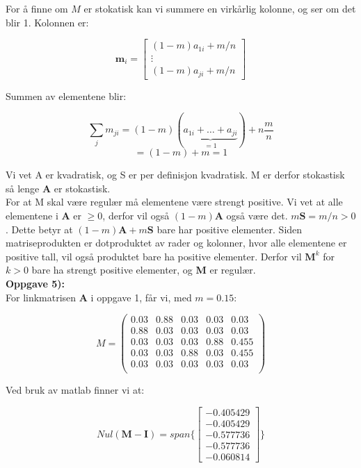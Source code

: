 \documentclass[a4paper,norsk,11pt,twoside]{article}
\begin{document}
For å finne om $M$ er stokatisk kan vi summere en virkårlig kolonne, og ser om det blir 1. Kolonnen er:

$$
\textbf{m}_i =
\begin{bmatrix}
(1-m)a_{1i} + m/n\\ \vdots \\ (1-m)a_{ji} + m/n
\end{bmatrix}
$$

Summen av elementene blir:

$$
\sum_j m_{ji} =  (1-m)(\underbrace{a_{1i} + \ldots + a_{ji}}_{=1}) + n\frac{m}{n}
$$
$$
= (1-m) + m = 1
$$

Vi vet A er kvadratisk, og S er per definisjon kvadratisk. M er derfor stokastisk så lenge \textbf{A} er stokastisk.\\

For at M skal være regulær må elementene være strengt positive. Vi vet at alle elementene i \textbf{A} er $\geq 0$, derfor vil også $(1-m)\textbf{A}$ også være det. $m\textbf{S} = m/n > 0$. Dette betyr at $(1-m)\textbf{A} + m\textbf{S}$ bare har positive elementer. Siden matriseprodukten er dotproduktet av rader og kolonner, hvor alle elementene er positive tall, vil også produktet bare ha positive elementer. Derfor vil $\textbf{M}^{k}$ for $k>0$ bare ha strengt positive elementer, og \textbf{M} er regulær.\\

\textbf{Oppgave 5):}\\

For linkmatrisen \textbf{A} i oppgave 1, får vi, med $m = 0.15$:

$$
M = 
\begin{pmatrix}
0.03 & 0.88 & 0.03 & 0.03 & 0.03\\
0.88 & 0.03 & 0.03 & 0.03 & 0.03\\
0.03 & 0.03 & 0.03 & 0.88 & 0.455\\
0.03 & 0.03 & 0.88 & 0.03 & 0.455\\
0.03 & 0.03 & 0.03 & 0.03 & 0.03\\
\end{pmatrix}
$$

Ved bruk av matlab finner vi at:

$$
Nul(\textbf{M} - \textbf{I}) = span\{ \begin{bmatrix}
-0.405429 \\ -0.405429 \\ -0.577736 \\ -0.577736 \\ -0.060814
\end{bmatrix} \}
$$
\end{document}
